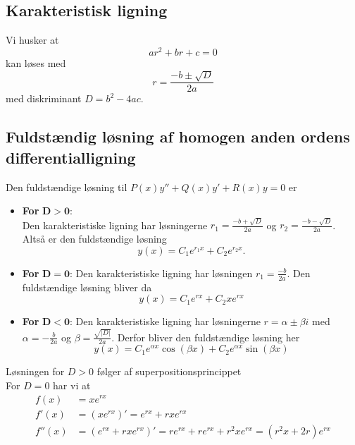 \newpage
\subsection{Karakteristisk ligning}
Vi husker at
\[
  ar^2 +br+c = 0
\]
kan løses med
\[
r = \frac{-b \pm \sqrt{D} }{2a} 
\]
med diskriminant $D = b^2 - 4ac$.

\subsection{Fuldstændig løsning af homogen anden ordens differentialligning}
\begin{sæt}
Den fuldstændige løsning til $P(x)y'' + Q(x)y' + R(x)y = 0$ er
\begin{itemize}
  \item \textbf{For} $\mathbf{D>0}$: \\
    Den karakteristiske ligning har løsningerne $r_1 = \frac{-b+\sqrt{D} }{2a}$ og $r_2 = \frac{-b-\sqrt{D} }{2a}$. Altså er den fuldstændige løsning
    \begin{equation}
      y(x) = C_1e^{r_1x} + C_2e^{r_2x}.
    \end{equation}
  \item \textbf{For} $\mathbf{D=0}$:
    Den karakteristiske ligning har løsningen $r_1 = \frac{-b}{2a}$. Den fuldstændige løsning bliver da
  \begin{equation}
     y(x) = C_1e^{rx} + C_2xe^{rx}
  \end{equation}
\item \textbf{For} $\mathbf{D<0}$:
    Den karakteristiske ligning har løsningerne $r = \alpha \pm \beta i$ med $\alpha = -\frac{b}{2a}$ og $\beta = \frac{\sqrt{|D|}}{2a}$. Derfor bliver den fuldstændige løsning her
    \begin{equation}
      y(x) = C_1e^{\alpha x}\cos \left( \beta x \right) + C_2e^{\alpha x} \sin \left( \beta x \right) 
    \end{equation}
\end{itemize}
\tcblower
  Løsningen for $D>0$ følger af superpositionsprincippet \\
  \hr
  For $D=0$ har vi at
  \begin{align*}
    f(x) &= xe^{rx} \\
    f'(x) &= \left( xe^{rx} \right)' = e^{rx} + rxe^{rx}   \\
    f''(x) &= (e^{rx} +rxe^{rx})' = re^{rx} + re^{rx} + r^{2}xe^{rx} = \left( r^2x+2r \right)e^{rx}      \\

\end{align*}
\end{sæt}
